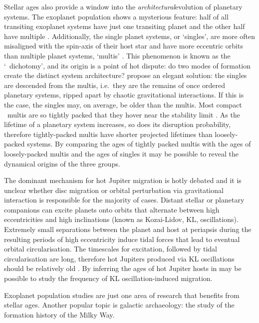 Stellar ages also provide a window into the {\it architectural}\/evolution of
planetary systems.
The exoplanet population shows a mysterious feature: half of all transiting
exoplanet systems have just one transiting planet and the other half have
multiple \citep[e.g.][]{lissauer, johansen, ballard}.
Additionally, the single planet systems, or `singles', are more often
misaligned with the spin-axis of their host star and have more eccentric
orbits than multiple planet systems, `multis' \citep[e.g.][]{morton, winn}.
This phenomenon is known as the `\Kepler\ dichotomy', and its origin is
a point of hot dispute: do two modes of formation create the distinct system
architecture?
\citet{Pu2015} propose an elegant solution: the singles are descended from the
multis, i.e.\ they are the remains of once ordered planetary systems, ripped
apart by chaotic gravitational interactions.
If this is the case, the singles may, on average, be older than the multis.
Most compact \Kepler\ multis are so tightly packed that they hover near the
stability limit \citep{fang}.
As the lifetime of a planetary system increases, so does its disruption
probability, therefore tightly-packed multis have shorter projected lifetimes
than loosely-packed systems.
By comparing the ages of tightly packed multis with the ages of loosely-packed
multis and the ages of singles it may be possible to reveal the dynamical
origins of the three groups.

The dominant mechanism for hot Jupiter migration is hotly debated and it is
unclear whether disc migration or orbital perturbation via gravitational
interaction is responsible for the majority of cases.
Distant stellar or planetary companions can excite planets onto orbits that
alternate between high eccentricities and high inclinations (known as
Kozai-Lidov, KL, oscillations).
Extremely small separations between the planet and host at periapsis during
the resulting periods of high eccentricity induce tidal forces that lead to
eventual orbital circularisation.
The timescales for excitation, followed by tidal circularisation are long,
therefore hot Jupiters produced via KL oscillations should be relatively old
\citep{petrovich}.
By inferring the ages of hot Jupiter hosts in may be possible to study the
frequency of KL oscillation-induced migration.

Exoplanet population studies are just one area of research that benefits from
stellar ages.
Another popular topic is galactic archaeology: the study of the formation
history of the Milky Way.

